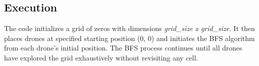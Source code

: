 \subsection{Execution}

The code initializes a grid of zeros with dimensions \textit{grid\_size x grid\_size}. It then places drones at specified starting position (0, 0) and initiates the BFS algorithm from each drone's initial position. The BFS process continues until all drones have explored the grid exhaustively without revisiting any cell.
